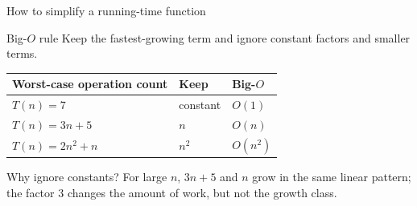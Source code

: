 \documentclass[aspectratio=169]{beamer}
\begin{document}
\begin{frame}{How to simplify a running-time function}
  \small
  \begin{block}{Big-$O$ rule}
    Keep the fastest-growing term and ignore constant factors and smaller terms.
  \end{block}
  \vspace{0.25em}
  \begin{center}
    \begin{tabular}{L{0.30\textwidth}L{0.25\textwidth}L{0.29\textwidth}}
      \toprule
      \textbf{Worst-case operation count} & \textbf{Keep} & \textbf{Big-$O$} \\
      \midrule
      $T(n)=7$ & constant & $O(1)$ \\
      \addlinespace
      $T(n)=3n+5$ & $n$ & $O(n)$ \\
      \addlinespace
      $T(n)=2n^2+n$ & $n^2$ & $O(n^2)$ \\
      \bottomrule
    \end{tabular}
  \end{center}
  \vspace{0.4em}
  \begin{exampleblock}{Why ignore constants?}
    For large $n$, $3n+5$ and $n$ grow in the same linear pattern; the factor
    $3$ changes the amount of work, but not the growth class.
  \end{exampleblock}
\end{frame}
\end{document}

